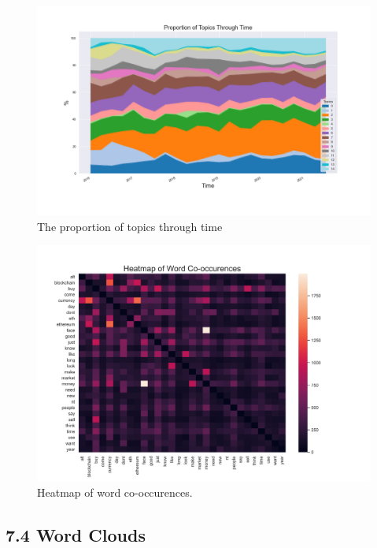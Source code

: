 \documentclass[
]{article}
\begin{document}
\begin{figure}

{\centering \includegraphics[width=1\linewidth]{images/07 - Topics over time} 

}

\caption{The proportion of topics through time}\label{fig:proptime}
\end{figure}

\begin{figure}

{\centering \includegraphics[width=1\linewidth]{images/09 - heatmap} 

}

\caption{Heatmap of word co-occurences.}\label{fig:heatmap}
\end{figure}

\newpage

\hypertarget{word-clouds}{%
\subsection{7.4 Word Clouds}\label{word-clouds}}
\end{document}
